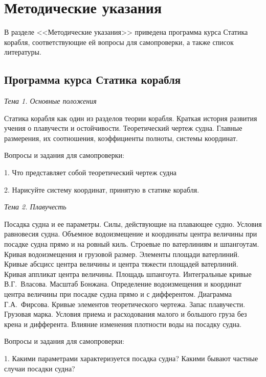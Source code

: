 \chapter{Методические указания}

В разделе <<Методические указания>> приведена программа курса Статика корабля, соответствующие ей вопросы для самопроверки, а также список литературы.

\section{Программа курса Статика корабля}

\textit{Тема 1. Основные положения}

Статика корабля как один из разделов теории корабля.
Краткая история развития учения о плавучести и остойчивости.
Теоретический чертеж судна.
Главные размерения, их соотношения, коэффициенты полноты, системы координат.

\vspace{0.5cm}

Вопросы и задания для самопроверки:

1.	Что представляет собой теоретический чертеж судна

2.	Нарисуйте систему координат, принятую в статике корабля.

\vspace{0.5cm}

\textit{Тема 2. Плавучесть}

Посадка судна и ее параметры.
Силы, действующие на плавающее судно.
Условия равновесия судна.
Объемное водоизмещение и координаты центра величины при посадке судна прямо и на ровный киль.
Строевые по ватерлиниям и шпангоутам.
Кривая водоизмещения и грузовой размер.
Элементы площади ватерлиний.
Кривые абсцисс центра величины и центра тяжести площадей ватерлиний.
Кривая аппликат центра величины.
Площадь шпангоута. Интегральные кривые В.Г.~Власова.
Масштаб Бонжана.
Определение водоизмещения и координат центра величины при посадке судна прямо и с дифферентом.
Диаграмма Г.А.~Фирсова.
Кривые элементов теоретического чертежа.
Запас плавучести.
Грузовая марка.
Условия приема и расходования малого и большого груза без крена и дифферента.
Влияние изменения плотности воды на посадку судна.

\vspace{0.5cm}

Вопросы и задания для самопроверки:

1.	Какими параметрами характеризуется посадка судна? Какими бывают частные случаи посадки судна?

